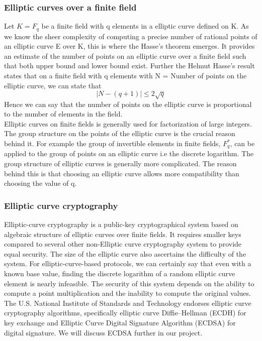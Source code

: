 \documentclass{article}
\begin{document}
\subsubsection{Elliptic curves over a finite field}
Let $K = F_q$ be a finite field with q elements in a elliptic curve defined on K. As we know the sheer complexity of computing a precise number of rational points of an elliptic curve E over K, this is where the Hasse's theorem emerges. It provides an estimate of the number of points on an elliptic curve over a finite field such that both upper bound and lower bound exist.
Further the Helmut Hasse's result states that on a finite field with q elements with
N = Number of points on the elliptic curve, we can state that
$$ |N-(q+1)|\leq 2{\sqrt q}$$
Hence we can say that the number of points on the elliptic curve is proportional to the number of elements in the field.\\
Elliptic curves on finite fields is generally used for factorization of large integers. The group structure on the points of the elliptic curve is the crucial reason behind it. For example the group of invertible elements in finite fields, $F^*_q$, can  be applied to the group of points on an elliptic curve i.e the discrete logarithm. The group structure of elliptic curves is generally more complicated. The reason behind this is that choosing an elliptic curve allows more compatibility than choosing the value of q. 

\subsubsection{Elliptic curve cryptography}
Elliptic-curve cryptography is a public-key cryptographical system based on algebraic structure of elliptic curves over finite fields. It requires smaller keys compared to several other non-Elliptic curve cryptography system to provide equal security. The size of the elliptic curve also ascertains the difficulty of the system.
For elliptic-curve-based protocols, we can certainly say that even with a known base value, finding the discrete logarithm of a random elliptic curve element is nearly infeasible. The security of this system depends on the ability to compute a point multiplication and the inability to compute the original values. The U.S. National Institute of Standards and Technology endorses elliptic curve cryptography algorithms, specifically elliptic curve Diffie–Hellman (ECDH) for key exchange and Elliptic Curve Digital Signature Algorithm (ECDSA) for digital signature. We will discuss ECDSA further in our project.
\end{document}
